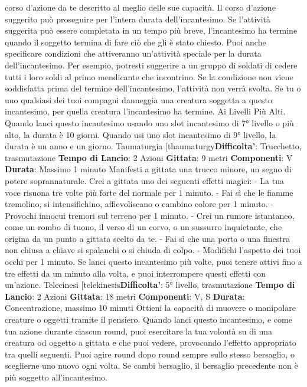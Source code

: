 \begin{multicols}{2}
corso d’azione da te descritto al meglio delle sue
capacità. Il corso d’azione suggerito può proseguire per
l’intera durata dell’incantesimo. Se l’attività suggerita
può essere completata in un tempo più breve,
l’incantesimo ha termine quando il soggetto termina di
fare ciò che gli è stato chiesto.
Puoi anche specificare condizioni che attiveranno
un’attività speciale per la durata dell’incantesimo. Per
esempio, potresti suggerire a un gruppo di soldati di
cedere tutti i loro soldi al primo mendicante che
incontrino. Se la condizione non viene soddisfatta prima
del termine dell’incantesimo, l’attività non verrà svolta.
Se tu o uno qualsiasi dei tuoi compagni danneggia una
creatura soggetta a questo incantesimo, per quella
creatura l’incantesimo ha termine.
Ai Livelli Più Alti. Quando lanci questo incantesimo
usando uno slot incantesimo di 7° livello o più alto, la
durata è 10 giorni. Quando usi uno slot incantesimo di
9° livello, la durata è un anno e un giorno.
Taumaturgia
[thaumaturgy\textbf{Difficolta'}:
Trucchetto, trasmutazione
\textbf{Tempo di Lancio}: 2 Azioni
\textbf{Gittata}: 9 metri
\textbf{Componenti}: V
\textbf{Durata}: Massimo 1 minuto
Manifesti a gittata una trucco minore, un segno di
potere soprannaturale. Crei a gittata uno dei seguenti
effetti magici:
- La tua voce risuona tre volte più forte del normale
per 1 minuto.
- Fai sì che le fiamme tremolino, si intensifichino,
affievoliscano o cambino colore per 1 minuto.
- Provochi innocui tremori sul terreno per 1 minuto.
- Crei un rumore istantaneo, come un rombo di tuono,
il verso di un corvo, o un sussurro inquietante, che
origina da un punto a gittata scelto da te.
- Fai sì che una porta o una finestra non chiusa a
chiave si spalanchi o si chiuda di colpo.
- Modifichi l’aspetto dei tuoi occhi per 1 minuto.
Se lanci questo incantesimo più volte, puoi tenere attivi
fino a tre effetti da un minuto alla volta, e puoi
interrompere questi effetti con un’azione.
Telecinesi
[telekinesis\textbf{Difficolta'}:
5° livello, trasmutazione
\textbf{Tempo di Lancio}: 2 Azioni
\textbf{Gittata}: 18 metri
\textbf{Componenti}: V, S
\textbf{Durata}: Concentrazione, massimo 10 minuti
Ottieni la capacità di muovere o manipolare creature o
oggetti tramite il pensiero. Quando lanci questo
incantesimo, e come tua azione durante ciascun round,
puoi esercitare la tua volontà su di una creatura od
oggetto a gittata e che puoi vedere, provocando l’effetto
appropriato tra quelli seguenti. Puoi agire round dopo
round sempre sullo stesso bersaglio, o sceglierne uno
nuovo ogni volta. Se cambi bersaglio, il bersaglio
precedente non è più soggetto all’incantesimo.

\end{multicols}
